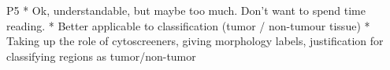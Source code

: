 




P5
* Ok, understandable, but maybe too much. Don’t want to spend time reading.
* Better applicable to classification (tumor / non-tumour tissue)
* Taking up the role of cytoscreeners, giving morphology labels, justification for classifying regions as tumor/non-tumor

